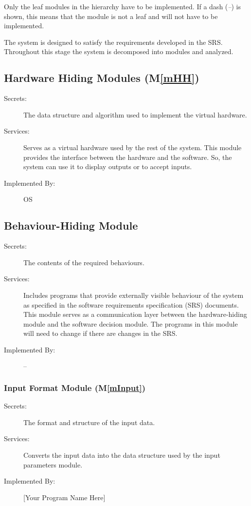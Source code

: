 \documentclass[12pt, titlepage]{article}
\newcommand{\mref}[1]{M\ref{#1}}
\begin{document}
Only the leaf modules in the
hierarchy have to be implemented. If a dash (\emph{--}) is shown, this means
that the module is not a leaf and will not have to be implemented. 

The system is designed to satisfy the requirements developed in the SRS. Throughout
this stage the system is decomposed into modules and analyzed.

\subsection{Hardware Hiding Modules (\mref{mHH})}

\begin{description}
\item[Secrets:]The data structure and algorithm used to implement the virtual
  hardware.
\item[Services:]Serves as a virtual hardware used by the rest of the
  system. This module provides the interface between the hardware and the
  software. So, the system can use it to display outputs or to accept inputs.
\item[Implemented By:] OS
\end{description}

\subsection{Behaviour-Hiding Module}

\begin{description}
\item[Secrets:]The contents of the required behaviours.
\item[Services:]Includes programs that provide externally visible behaviour of
  the system as specified in the software requirements specification (SRS)
  documents. This module serves as a communication layer between the
  hardware-hiding module and the software decision module. The programs in this
  module will need to change if there are changes in the SRS.
\item[Implemented By:] --
\end{description}

\subsubsection{Input Format Module (\mref{mInput})}

\begin{description}
\item[Secrets:]The format and structure of the input data.
\item[Services:]Converts the input data into the data structure used by the
  input parameters module.
\item[Implemented By:] [Your Program Name Here]
\end{description}
\end{document}
